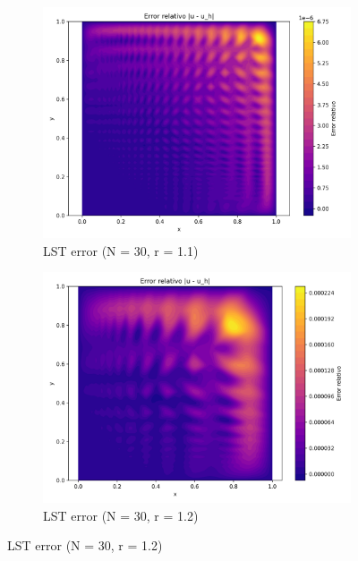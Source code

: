 \documentclass[12pt]{article}
\begin{document}
\begin{figure}[H]
    \centering
    \begin{subfigure}[t]{0.32\textwidth}
        \centering
        \includegraphics[width=\textwidth]{Graficos/31/LST_relative_error_colormap.png}
        \caption{LST error (N = 30, r = 1.1)}
        \label{fig:lst_error_r1.1_n30}
    \end{subfigure}
    \hfill
    \begin{subfigure}[t]{0.32\textwidth}
        \centering
        \includegraphics[width=\textwidth]{Graficos/32/LST_relative_error_colormap.png}
        \caption{LST error (N = 30, r = 1.2)}
        \label{fig:lst_error_r1.2_n30}
    \end{subfigure}

\end{figure}
\end{document}
